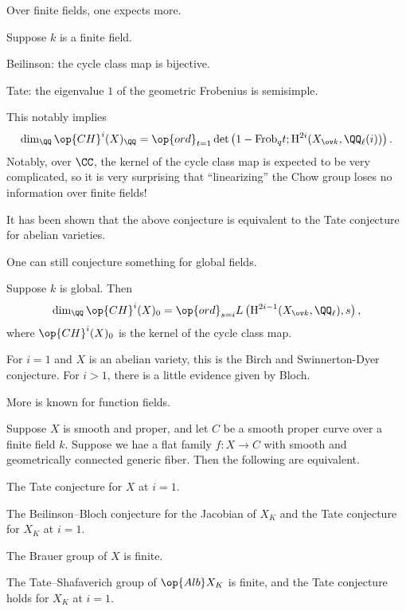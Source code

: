 \documentclass{article}
\begin{document}
Over finite fields, one expects more.
\begin{conj}
	Suppose $k$ is a finite field.
	\begin{listalph}
		\item Beilinson: the cycle class map is bijective.
		\item Tate: the eigenvalue $1$ of the geometric Frobenius is semisimple.
	\end{listalph}
\end{conj}
\begin{remark}
	This notably implies
	\[\dim_\QQ\op{CH}^i(X)_\QQ=\op{ord}_{t=1}\det\left(1-\mathrm{Frob}_qt;\mathrm H^{2i}(X_{\ov k},\QQ_\ell(i))\right).\]
	Notably, over $\CC$, the kernel of the cycle class map is expected to be very complicated, so it is very surprising that ``linearizing'' the Chow group loses no information over finite fields!
\end{remark}
\begin{remark}
	It has been shown that the above conjecture is equivalent to the Tate conjecture for abelian varieties.
\end{remark}
One can still conjecture something for global fields.
\begin{conj}
	Suppose $k$ is global. Then
	\[\dim_\QQ\op{CH}^i(X)_0=\op{ord}_{s=i}L\left(\mathrm H^{2i-1}(X_{\ov k},\QQ_\ell),s\right),\]
	where $\op{CH}^i(X)_0$ is the kernel of the cycle class map.
\end{conj}
\begin{remark}
	For $i=1$ and $X$ is an abelian variety, this is the Birch and Swinnerton-Dyer conjecture. For $i>1$, there is a little evidence given by Bloch.
\end{remark}
More is known for function fields.
\begin{theorem}
	Suppose $X$ is smooth and proper, and let $C$ be a smooth proper curve over a finite field $k$. Suppose we hae a flat family $f\colon X\to C$ with smooth and geometrically connected generic fiber. Then the following are equivalent.
	\begin{listalph}
		\item The Tate conjecture for $X$ at $i=1$.
		\item The Beilinson--Bloch conjecture for the Jacobian of $X_K$ and the Tate conjecture for $X_K$ at $i=1$.
		\item The Brauer group of $X$ is finite.
		\item The Tate--Shafaverich group of $\op{Alb}X_K$ is finite, and the Tate conjecture holds for $X_K$ at $i=1$.
	\end{listalph}
\end{theorem}
\end{document}
